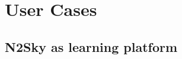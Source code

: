 \section{User Cases}\label{User Cases}

\subsection{N2Sky as learning platform}\label{N2Sky as learning platform}